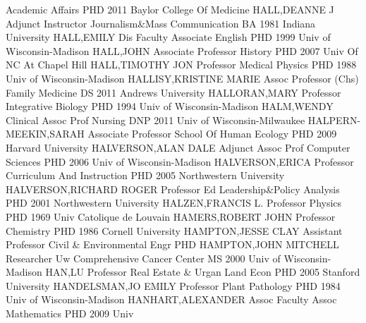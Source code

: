 \documentclass[
]{article}
\begin{document}
\textbar Academic Affairs \textbar PHD 2011 Baylor College Of Medicine
\textbar{}  \textbar HALL,DEANNE J \textbar Adjunct
Instructor \textbar Journalism\&Mass Communication \textbar BA 1981
Indiana University \textbar{}  \textbar HALL,EMILY
\textbar Dis Faculty Associate \textbar English \textbar PHD 1999 Univ
of Wisconsin-Madison \textbar{}  \textbar HALL,JOHN
\textbar Associate Professor \textbar History \textbar PHD 2007 Univ Of
NC At Chapel Hill \textbar{}  \textbar HALL,TIMOTHY JON
\textbar Professor \textbar Medical Physics \textbar PHD 1988 Univ of
Wisconsin-Madison \textbar{}  \textbar HALLISY,KRISTINE
MARIE \textbar Assoc Professor (Chs) \textbar Family Medicine
\textbar DS 2011 Andrews University \textbar{} 
\textbar HALLORAN,MARY \textbar Professor \textbar Integrative Biology
\textbar PHD 1994 Univ of Wisconsin-Madison \textbar{} 
\textbar HALM,WENDY \textbar Clinical Assoc Prof \textbar Nursing
\textbar DNP 2011 Univ of Wisconsin-Milwaukee \textbar{} 
\textbar HALPERN-MEEKIN,SARAH \textbar Associate Professor
\textbar School Of Human Ecology \textbar PHD 2009 Harvard University
\textbar{}  \textbar HALVERSON,ALAN DALE \textbar Adjunct
Assoc Prof \textbar Computer Sciences \textbar PHD 2006 Univ of
Wisconsin-Madison \textbar{}  \textbar HALVERSON,ERICA
\textbar Professor \textbar Curriculum And Instruction \textbar PHD 2005
Northwestern University \textbar{} 
\textbar HALVERSON,RICHARD ROGER \textbar Professor \textbar Ed
Leadership\&Policy Analysis \textbar PHD 2001 Northwestern University
\textbar{}  \textbar HALZEN,FRANCIS L. \textbar Professor
\textbar Physics \textbar PHD 1969 Univ Catolique de Louvain \textbar{}
 \textbar HAMERS,ROBERT JOHN \textbar Professor
\textbar Chemistry \textbar PHD 1986 Cornell University \textbar{}
 \textbar HAMPTON,JESSE CLAY \textbar Assistant Professor
\textbar Civil \& Environmental Engr \textbar PHD \textbar{}
 \textbar HAMPTON,JOHN MITCHELL \textbar Researcher
\textbar Uw Comprehensive Cancer Center \textbar MS 2000 Univ of
Wisconsin-Madison \textbar{}  \textbar HAN,LU
\textbar Professor \textbar Real Estate \& Urgan Land Econ \textbar PHD
2005 Stanford University \textbar{}  \textbar HANDELSMAN,JO
EMILY \textbar Professor \textbar Plant Pathology \textbar PHD 1984 Univ
of Wisconsin-Madison \textbar{}  \textbar HANHART,ALEXANDER
\textbar Assoc Faculty Assoc \textbar Mathematics \textbar PHD 2009 Univ
\end{document}
